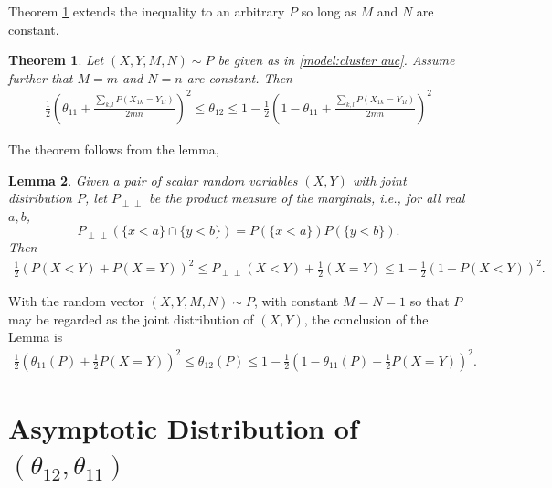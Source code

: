 \documentclass[12pt]{article}
\DeclareMathOperator{\AUC}{AUC}
\renewcommand{\P}{P}
\newcommand{\cind}{\perp \!\!\! \perp}
\newcommand{\aucindiv}{\theta_{11}}%
\newcommand{\aucpop}{\theta_{12}}%
\newtheorem{theorem}{Theorem}
\newtheorem{lemma}[theorem]{Lemma}
\begin{document}
Theorem \ref{theorem:bounds} extends the inequality to an arbitrary $\P$ so long as $M$ and $N$ are constant.

\begin{theorem}\label{theorem:bounds}
  Let $(X,Y,M,N)\sim \P$ be given as in \eqref{model:cluster auc}. Assume
  further that $M=m$ and $N=n$ are constant. Then
  \begin{align}
    \frac{1}{2}\left(\aucindiv+\frac{\sum_{k,l}\P(X_{1k}=Y_{1l})}{2mn}\right)^2 \le \aucpop \le 1-\frac{1}{2}\left(1-\aucindiv+\frac{\sum_{k,l}\P(X_{1k}=Y_{1l})}{2mn}\right)^2
  \end{align}
\end{theorem}
\noindent The theorem follows from the lemma,
\begin{lemma}\label{lemma:bounds}  Given a pair of scalar random variables $(X,Y)$ with joint distribution $\P$, let $\P_{\cind}$ be the product measure of the marginals, i.e., for all real $a,b$,
  $$
  \P_{\cind}(\{x<a\}\cap\{y<b\})=\P(\{x<a\})\P(\{y<b\}).
  $$
  Then
  \begin{align}
    \frac{1}{2}(\P(X<Y)+\P(X=Y))^2 \le \P_{\cind}(X<Y)+\frac{1}{2}(X=Y)
    \le 1-\frac{1}{2}(1-\P(X<Y))^2.
  \end{align}
\end{lemma}

With the random vector $(X,Y,M,N) \sim \P$, with constant $M=N=1$ so that $\P$ may be regarded as the joint distribution of $(X,Y)$, the conclusion of the Lemma is
\begin{align}
  \frac{1}{2}(\aucindiv(\P)+\frac{1}{2}\P(X=Y))^2 \le \aucpop(P)
  \le 1-\frac{1}{2}(1-\aucindiv(\P)+\frac{1}{2}\P(X=Y))^2.\label{eqn:lemma:bounds:conclusion}
\end{align}









\section{Asymptotic Distribution of $(\aucpop,\aucindiv)$}\label{section:asymptotics}
\end{document}
